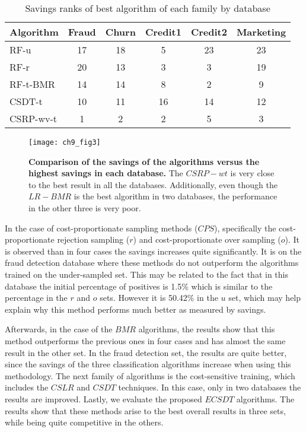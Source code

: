 {\begin{table}[!t]
  \end{table}
  \begin{table}[t]
    \centering
    \footnotesize
    \begin{tabular}{l c c c c c  } %
      \hline
      \bf{Algorithm} & \bf{Fraud} & \bf{Churn} &\bf{Credit1} & \bf{Credit2} & \bf{Marketing} \\
      \hline
      RF-u&17&18&5&23&23\\ 
      RF-r&20&13&3&3&19\\ 
      RF-t-BMR&14&14&8&2&9\\ 
      CSDT-t&10&11&16&14&12\\ 
      CSRP-wv-t&1&2&2&5&3\\ 
      \hline
    \end{tabular}
    \caption{Savings ranks of best algorithm of each family by database}
    \label{tab:9:results_best}
  \end{table}

  \begin{figure}[t]
    \centering
    \texttt{[image: ch9\_fig3]}
    \caption{\textbf{Comparison of the savings of the algorithms versus the highest savings in 
    each database.} The $CSRP-wt$ is very close to the best result in all the databases. 
    Additionally, even though the $LR-BMR$ is the best algorithm in two databases, the performance 
    in the other three is very poor.}
    \label{fig:9:comparison_best}
  \end{figure} 
  
  In the case of cost-proportionate sampling methods ($CPS$), specifically the 
  cost-proportionate rejection sampling ($r$) and cost-proportionate over 
  sampling ($o$). It is observed than in four cases the savings increases quite 
  significantly. It is on the fraud detection database where these methods do not outperform the 
  algorithms trained on the under-sampled set. This may be related to the fact that in this 
  database the initial percentage of positives is 1.5\% which is similar to the percentage in the 
  $r$ and   $o$ sets. However it is 50.42\% in the $u$ set, which may help explain why this method 
  performs much better as measured by savings.

  Afterwards, in the case of the $BMR$ algorithms, the results show that this method outperforms 
  the previous ones in four cases and has almost the same result in the other set. In the fraud 
  detection  set, the results are quite better, since the savings of the three classification 
  algorithms increase when using this methodology. The next family of algorithms is the 
  cost-sensitive training, which includes the $CSLR$ and $CSDT$ techniques. In this case, only in 
  two databases the results are improved. Lastly, we evaluate the proposed $ECSDT$ algorithms. The 
  results show that these methods arise to the best overall results in three sets, while being 
  quite competitive in the others.
  
}
